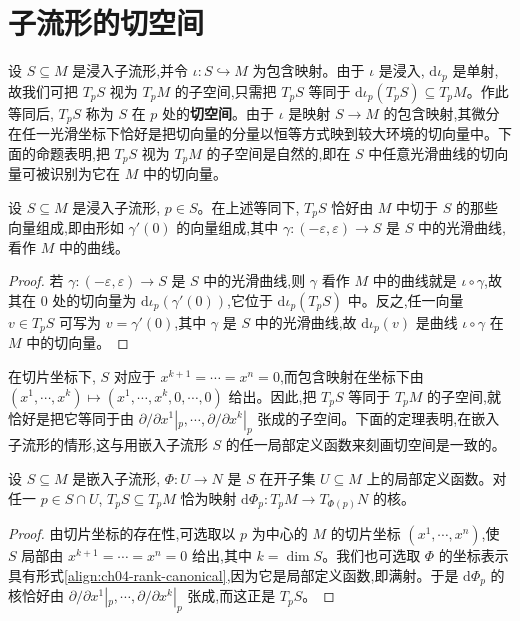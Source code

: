 \documentclass[../../main.tex]{subfiles}
\begin{document}
\section{子流形的切空间}\label{section:ch05-子流形的切空间}

设 $S\subseteq M$ 是浸入子流形,并令 $\iota:S\hookrightarrow M$ 为包含映射。由于 $\iota$ 是浸入, $\mathrm{d}\iota_p$ 是单射,故我们可把 $T_pS$ 视为 $T_pM$ 的子空间,只需把 $T_pS$ 等同于 $\mathrm{d}\iota_p(T_pS)\subseteq T_pM$。作此等同后, $T_pS$ 称为 $S$ 在 $p$ 处的\textbf{切空间}。由于 $\iota$ 是映射 $S\to M$ 的包含映射,其微分在任一光滑坐标下恰好是把切向量的分量以恒等方式映到较大环境的切向量中。下面的命题表明,把 $T_pS$ 视为 $T_pM$ 的子空间是自然的,即在 $S$ 中任意光滑曲线的切向量可被识别为它在 $M$ 中的切向量。

\begin{proposition}\label{proposition:ch05-tangent-vector-identification}
设 $S\subseteq M$ 是浸入子流形, $p\in S$。在上述等同下, $T_pS$ 恰好由 $M$ 中切于 $S$ 的那些向量组成,即由形如 $\gamma'(0)$ 的向量组成,其中 $\gamma:(-\varepsilon,\varepsilon)\to S$ 是 $S$ 中的光滑曲线,看作 $M$ 中的曲线。
\end{proposition}

\begin{proof}
若 $\gamma:(-\varepsilon,\varepsilon)\to S$ 是 $S$ 中的光滑曲线,则 $\gamma$ 看作 $M$ 中的曲线就是 $\iota\circ\gamma$,故其在 $0$ 处的切向量为 $\mathrm{d}\iota_p(\gamma'(0))$,它位于 $\mathrm{d}\iota_p(T_pS)$ 中。反之,任一向量 $v\in T_pS$ 可写为 $v=\gamma'(0)$,其中 $\gamma$ 是 $S$ 中的光滑曲线,故 $\mathrm{d}\iota_p(v)$ 是曲线 $\iota\circ\gamma$ 在 $M$ 中的切向量。
\end{proof}

在切片坐标下, $S$ 对应于 $x^{k+1}=\cdots=x^n=0$,而包含映射在坐标下由 $(x^1,\cdots ,x^k)\mapsto(x^1,\cdots ,x^k,0,\cdots ,0)$ 给出。因此,把 $T_pS$ 等同于 $T_pM$ 的子空间,就恰好是把它等同于由 $\partial/\partial x^1|_p,\cdots ,\partial/\partial x^k|_p$ 张成的子空间。下面的定理表明,在嵌入子流形的情形,这与用嵌入子流形 $S$ 的任一局部定义函数来刻画切空间是一致的。

\begin{theorem}\label{theorem:ch05-tangent-level-set}
设 $S\subseteq M$ 是嵌入子流形, $\Phi:U\to N$ 是 $S$ 在开子集 $U\subseteq M$ 上的局部定义函数。对任一 $p\in S\cap U$, $T_pS\subseteq T_pM$ 恰为映射 $\mathrm{d}\Phi_p:T_pM\to T_{\Phi(p)}N$ 的核。
\end{theorem}

\begin{proof}
由切片坐标的存在性,可选取以 $p$ 为中心的 $M$ 的切片坐标 $(x^1,\cdots ,x^n)$,使 $S$ 局部由 $x^{k+1}=\cdots=x^n=0$ 给出,其中 $k=\dim S$。我们也可选取 $\Phi$ 的坐标表示具有形式\eqref{align:ch04-rank-canonical},因为它是局部定义函数,即满射。于是 $\mathrm{d}\Phi_p$ 的核恰好由 $\partial/\partial x^1|_p,\cdots ,\partial/\partial x^k|_p$ 张成,而这正是 $T_pS$。
\end{proof}
\end{document}
